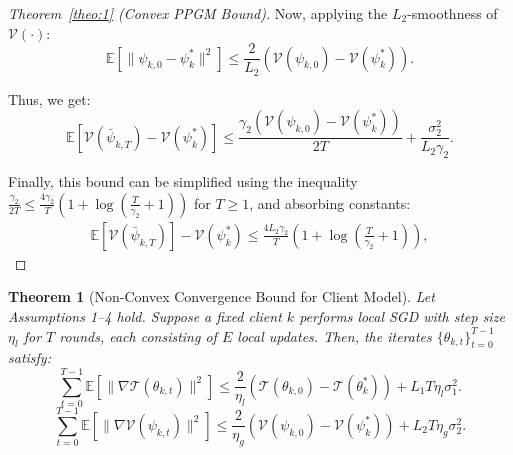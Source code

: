 \documentclass[lettersize,journal]{IEEEtran}
\newtheorem{theorem}{Theorem}
\newtheorem{proof}{Proof}
\begin{document}
\begin{proof}[Theorem~\ref{theo:1} (Convex \emph{PPGM} Bound)]
Now, applying the $L_2$-smoothness of $\mathcal{V}(\cdot)$:
\begin{equation}
    \mathbb{E}[\|\psi_{k,0} - \psi_k^*\|^2] \leq \frac{2}{L_2} (\mathcal{V}(\psi_{k,0}) - \mathcal{V}(\psi_k^*)).
\end{equation}

Thus, we get:
\begin{equation}
    \mathbb{E}[\mathcal{V}(\bar{\psi}_{k,T}) - \mathcal{V}(\psi_k^*)] 
    \leq \frac{\gamma_2 (\mathcal{V}(\psi_{k,0}) - \mathcal{V}(\psi_k^*))}{2T} + \frac{\sigma_2^2}{L_2 \gamma_2}.
\end{equation}

Finally, this bound can be simplified using the inequality $\frac{\gamma_2}{2T} \leq \frac{4\gamma_2}{T}(1 + \log(\frac{T}{\gamma_2} + 1))$ for $T \geq 1$, and absorbing constants:
\begin{equation}
\begin{split}
    \mathbb{E}[\mathcal{V}(\bar{\psi}_{k,T})] - \mathcal{V}(\psi_k^*) 
    \leq \frac{4L_2\gamma_2}{T} \left(1 + \log\left(\frac{T}{\gamma_2} + 1\right)\right),
\end{split}
\end{equation}
\end{proof}


\begin{theorem}[Non-Convex Convergence Bound for Client Model]
\label{theo:2}
Let Assumptions 1--4 hold. Suppose a fixed client \( k \) performs local SGD with step size \( \eta_l \) for \( T \) rounds, each consisting of \( E \) local updates. Then, the iterates \( \{\theta_{k,t}\}_{t=0}^{T-1} \) satisfy:
\begin{equation}
    \sum_{t=0}^{T-1} \mathbb{E}[\|\nabla \mathcal{T}(\theta_{k,t})\|^2]
    \leq \frac{2}{\eta_l} \left( \mathcal{T}(\theta_{k,0}) - \mathcal{T}(\theta_k^*) \right) + L_1 T \eta_l \sigma_1^2.
\end{equation}
\begin{equation}
	\sum_{t=0}^{T-1} \mathbb{E}[\|\nabla \mathcal{V}(\psi_{k,t})\|^2]
	\leq \frac{2}{\eta_g} \left( \mathcal{V}(\psi_{k,0}) - \mathcal{V}(\psi_k^*) \right) + L_2 T \eta_g \sigma_2^2.
\end{equation}
\end{theorem}
\end{document}
